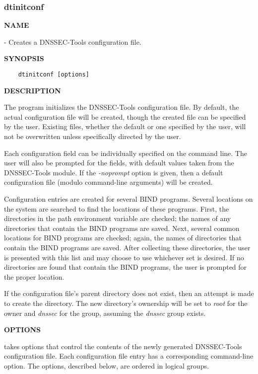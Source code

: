 \clearpage

\subsubsection{\bf dtinitconf}

{\bf NAME}

 - Creates a DNSSEC-Tools configuration file.

{\bf SYNOPSIS}

\begin{verbatim}
    dtinitconf [options]
\end{verbatim}

{\bf DESCRIPTION}

The  program initializes the DNSSEC-Tools configuration file.
By default, the actual configuration file will be created, though the created
file can be specified by the user.  Existing files, whether the default or one
specified by the user, will not be overwritten unless specifically directed
by the user.

Each configuration field can be individually specified on the command line.
The user will also be prompted for the fields, with default values taken from
the DNSSEC-Tools  module.  If the {\it -noprompt} option is
given, then a default configuration file (modulo command-line arguments) will
be created.

Configuration entries are created for several BIND programs.  Several
locations on the system are searched to find the locations of these programs. 
First, the directories in the path environment variable are checked; the
names of any directories that contain the BIND programs are saved.  Next,
several common locations for BIND programs are checked; again, the names of
directories that contain the BIND programs are saved.  After collecting these
directories, the user is presented with this list and may choose to use
whichever set is desired.  If no directories are found that contain the BIND
programs, the user is prompted for the proper location.

If the configuration file's parent directory does not exist, then an attempt
is made to create the directory.  The new directory's ownership will be set to
{\it root} for the owner and {\it dnssec} for the group, assuming the {\it
dnssec} group exists.

{\bf OPTIONS}

 takes options that control the contents of the newly generated
DNSSEC-Tools configuration file.  Each configuration file entry has a
corresponding command-line option.  The options, described below, are ordered
in logical groups.

